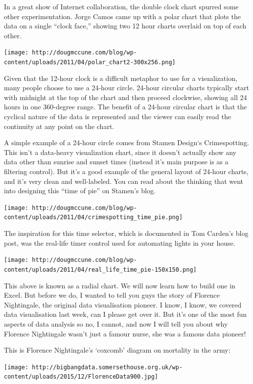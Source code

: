 \documentclass[]{book}
\theoremstyle{definition}
\theoremstyle{definition}
\theoremstyle{definition}
\theoremstyle{remark}
\begin{document}
In a great show of Internet collaboration, the double clock chart
spurred some other experimentation. Jorge Camos came up with a polar
chart that plots the data on a single ``clock face,'' showing two 12
hour charts overlaid on top of each other.

\texttt{[image: http://dougmccune.com/blog/wp-content/uploads/2011/04/polar\_chart2-300x256.png]}

Given that the 12-hour clock is a difficult metaphor to use for a
visualization, many people choose to use a 24-hour circle. 24-hour
circular charts typically start with midnight at the top of the chart
and then proceed clockwise, showing all 24 hours in one 360-degree
range. The benefit of a 24-hour circular chart is that the cyclical
nature of the data is represented and the viewer can easily read the
continuity at any point on the chart.

A simple example of a 24-hour circle comes from Stamen Design`s
Crimespotting. This isn't a data-heavy visualization chart, since it
doesn't actually show any data other than sunrise and sunset times
(instead it's main purpose is as a filtering control). But it's a good
example of the general layout of 24-hour charts, and it's very clean and
well-labeled. You can read about the thinking that went into designing
this ``time of pie'' on Stamen's blog.

\texttt{[image: http://dougmccune.com/blog/wp-content/uploads/2011/04/crimespotting\_time\_pie.png]}

The inspiration for this time selector, which is documented in Tom
Carden's blog post, was the real-life timer control used for automating
lights in your house.

\texttt{[image: http://dougmccune.com/blog/wp-content/uploads/2011/04/real\_life\_time\_pie-150x150.png]}

This above is known as a radial chart. We will now learn how to build
one in Excel. But before we do, I wanted to tell you guys the story of
Florence Nightingale, the original data visualisation pioneer. I know, I
know, we covered data visualisation last week, can I please get over it.
But it's one of the most fun aspects of data analysis so no, I cannot,
and now I will tell you about why Florence Nightingale wasn't just a
famour nurse, she was a famous data pioneer!

This is Florence Nightingale's `coxcomb' diagram on mortality in the
army:

\texttt{[image: http://bigbangdata.somersethouse.org.uk/wp-content/uploads/2015/12/FlorenceData900.jpg]}
\end{document}
